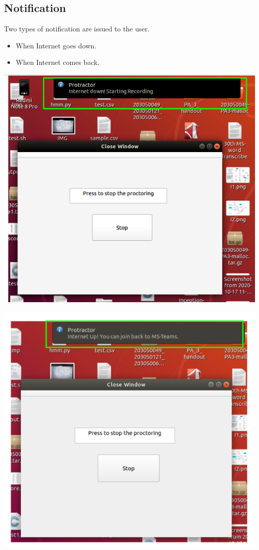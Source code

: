 \documentclass{article}
\begin{document}
\subsection{Notification}
Two types of notification are issued to the user.
\begin{itemize}
    \item When Internet goes down.
    \item When Internet comes back.
\end{itemize}
\begin{center}
\includegraphics[scale=0.5]{InternetDown.png}    
\end{center}
\begin{center}
\includegraphics[scale=0.8]{InternetUp.png}    
\end{center}
\end{document}
